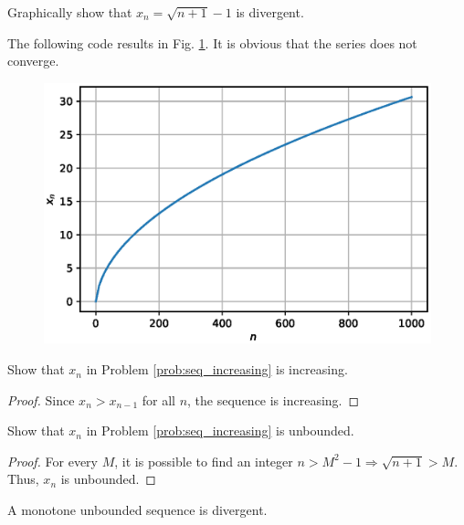 \documentclass[journal,12pt,twocolumn]{IEEEtran}
\begin{document}
\begin{problem}
\label{prob:seq_increasing}
Graphically show that $x_n = \sqrt{n+1} - 1$ is divergent.
\end{problem}
\solution The following code results in Fig. \ref{fig:seq_diverge}. It is obvious that the series does not converge.

\begin{figure}[!ht]
\begin{center}
\includegraphics[width=\columnwidth]{./figs/seq_diverge.eps}
\end{center}
\label{fig:seq_diverge}	
\end{figure}
\begin{problem}
Show that $x_n$ in Problem \ref{prob:seq_increasing} is increasing.
\end{problem}
\begin{proof}
Since $x_n > x_{n-1}$ for all $n$, the sequence is increasing.
\end{proof}
\begin{problem}
Show that $x_n$ in Problem \ref{prob:seq_increasing} is unbounded.
\end{problem}
\begin{proof}
For every $M$, it is possible to find an integer $n > M^2 - 1 \Rightarrow \sqrt{n+1} > M$.  Thus, $x_n$ is unbounded.
\end{proof}
\begin{proposition}
A monotone unbounded sequence is divergent.
\end{proposition}
\end{document}
